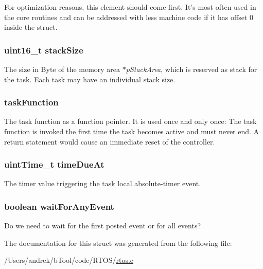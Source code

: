  For optimization reasons, this element should come first. It's most often used in the core routines and can be addressed with less machine code if it has offset 0 inside the struct. \hypertarget{structtask__t_ad1781e9cc344b34a0ba6f6a896c6ed93}{
\subsubsection[{stack\-Size}]{\setlength{\rightskip}{0pt plus 5cm}uint16\-\_\-t stack\-Size}}\label{structtask__t_ad1781e9cc344b34a0ba6f6a896c6ed93}
The size in Byte of the memory area {\itshape $\ast$p\-Stack\-Area}, which is reserved as stack for the task. Each task may have an individual stack size. \hypertarget{structtask__t_a4ab0b83e3ec3a3b0d61919a926ee3d26}{
\subsubsection[{task\-Function}]{ task\-Function}}\label{structtask__t_a4ab0b83e3ec3a3b0d61919a926ee3d26}
The task function as a function pointer. It is used once and only once\-: The task function is invoked the first time the task becomes active and must never end. A return statement would cause an immediate reset of the controller. \hypertarget{structtask__t_a18d0bc5a3a13ceef1c9036d56efe280d}{
\subsubsection[{time\-Due\-At}]{\setlength{\rightskip}{0pt plus 5cm}uint\-Time\-\_\-t time\-Due\-At}}\label{structtask__t_a18d0bc5a3a13ceef1c9036d56efe280d}
The timer value triggering the task local absolute-\/timer event. \hypertarget{structtask__t_a40beda2a55d5826268c79600bcce72a1}{
\subsubsection[{wait\-For\-Any\-Event}]{\setlength{\rightskip}{0pt plus 5cm}boolean wait\-For\-Any\-Event}}\label{structtask__t_a40beda2a55d5826268c79600bcce72a1}
Do we need to wait for the first posted event or for all events? 

The documentation for this struct was generated from the following file\-:\begin{DoxyCompactItemize}
\item 
/\-Users/andrek/b\-Tool/code/\-R\-T\-O\-S/\hyperlink{rtos_8c}{rtos.\-c}\end{DoxyCompactItemize}
